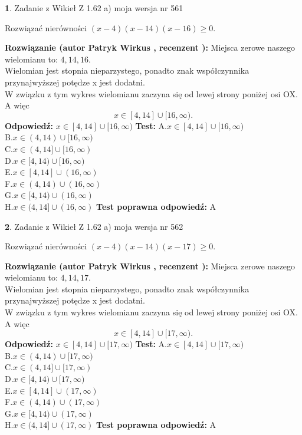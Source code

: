 \documentclass[12pt, a4paper]{article}
\theoremstyle{definition} %
\newtheorem{zad}{}
\newcommand{\zadStart}[1]{\begin{zad}#1\newline}
\newcommand{\zadStop}{\end{zad}}
\newcommand{\rozwStart}[2]{\noindent \textbf{Rozwiązanie (autor #1 , recenzent #2): }\newline}
\newcommand{\rozwStop}{\newline}
\newcommand{\odpStart}{\noindent \textbf{Odpowiedź:}\newline}
\newcommand{\odpStop}{\newline}
\newcommand{\testStart}{\noindent \textbf{Test:}\newline}
\newcommand{\testStop}{\newline}
\newcommand{\kluczStart}{\noindent \textbf{Test poprawna odpowiedź:}\newline}
\newcommand{\kluczStop}{\newline}
\begin{document}
\zadStart{Zadanie z Wikieł Z 1.62 a) moja wersja nr 561}

Rozwiązać nierówności $(x-4)(x-14)(x-16)\ge0$.
\zadStop
\rozwStart{Patryk Wirkus}{}
Miejsca zerowe naszego wielomianu to: $4, 14, 16$.\\
Wielomian jest stopnia nieparzystego, ponadto znak współczynnika przy\linebreak najwyższej potędze x jest dodatni.\\ W związku z tym wykres wielomianu zaczyna się od lewej strony poniżej osi OX. A więc $$x \in [4,14] \cup [16,\infty).$$
\rozwStop
\odpStart
$x \in [4,14] \cup [16,\infty)$
\odpStop
\testStart
A.$x \in [4,14] \cup [16,\infty)$\\
B.$x \in (4,14) \cup [16,\infty)$\\
C.$x \in (4,14] \cup [16,\infty)$\\
D.$x \in [4,14) \cup [16,\infty)$\\
E.$x \in [4,14] \cup (16,\infty)$\\
F.$x \in (4,14) \cup (16,\infty)$\\
G.$x \in [4,14) \cup (16,\infty)$\\
H.$x \in (4,14] \cup (16,\infty)$
\testStop
\kluczStart
A
\kluczStop



\zadStart{Zadanie z Wikieł Z 1.62 a) moja wersja nr 562}

Rozwiązać nierówności $(x-4)(x-14)(x-17)\ge0$.
\zadStop
\rozwStart{Patryk Wirkus}{}
Miejsca zerowe naszego wielomianu to: $4, 14, 17$.\\
Wielomian jest stopnia nieparzystego, ponadto znak współczynnika przy\linebreak najwyższej potędze x jest dodatni.\\ W związku z tym wykres wielomianu zaczyna się od lewej strony poniżej osi OX. A więc $$x \in [4,14] \cup [17,\infty).$$
\rozwStop
\odpStart
$x \in [4,14] \cup [17,\infty)$
\odpStop
\testStart
A.$x \in [4,14] \cup [17,\infty)$\\
B.$x \in (4,14) \cup [17,\infty)$\\
C.$x \in (4,14] \cup [17,\infty)$\\
D.$x \in [4,14) \cup [17,\infty)$\\
E.$x \in [4,14] \cup (17,\infty)$\\
F.$x \in (4,14) \cup (17,\infty)$\\
G.$x \in [4,14) \cup (17,\infty)$\\
H.$x \in (4,14] \cup (17,\infty)$
\testStop
\kluczStart
A
\kluczStop
\end{document}
